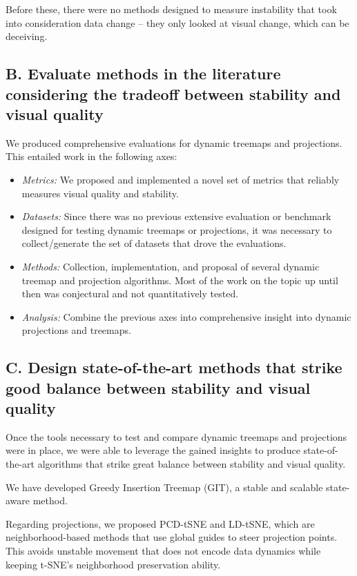 Before these, there were no methods designed to measure instability that took into consideration data change -- they only looked at visual change, which can be deceiving.


\subsection*{B. Evaluate methods in the literature considering the tradeoff between stability and visual quality}

We produced comprehensive evaluations for dynamic treemaps and projections.
This entailed work in the following axes:

\begin{itemize}
    \item \emph{Metrics:} We proposed and implemented a novel set of metrics that reliably measures visual quality and stability.
    \item \emph{Datasets:} Since there was no previous extensive evaluation or benchmark designed for testing dynamic treemaps or projections, it was necessary to collect/generate the set of datasets that drove the evaluations. 
    \item \emph{Methods:} Collection, implementation, and proposal of several dynamic treemap and projection algorithms. Most of the work on the topic up until then was conjectural and not quantitatively tested.  
    \item \emph{Analysis:} Combine the previous axes into comprehensive insight into dynamic projections and treemaps.
\end{itemize}

\subsection*{C. Design state-of-the-art methods that strike good balance between stability and visual quality}

Once the tools necessary to test and compare dynamic treemaps and projections were in place, we were able to leverage the gained insights to produce state-of-the-art algorithms that strike great balance between stability and visual quality.

We have developed Greedy Insertion Treemap (GIT), a stable and scalable state-aware method.

Regarding projections, we proposed PCD-tSNE and LD-tSNE, which are neighborhood-based methods that use global guides to steer projection points. This avoids unstable movement that does not encode data dynamics while keeping t-SNE's neighborhood preservation ability.


